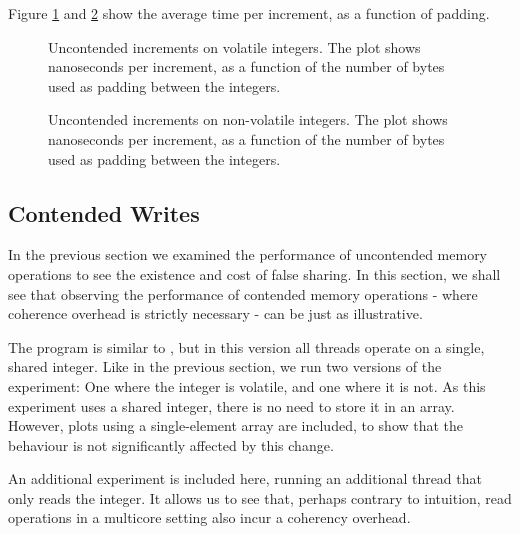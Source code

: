 Figure \ref{fig:uncont} and \ref{fig:uncont-nob} show the average time per
increment, as a function of padding.

\begin{figure}[hbpt]
\graphicspath{{plots/}}

\caption{Uncontended increments on volatile integers. The plot shows nanoseconds
	per increment, as a function of the number of bytes used as padding
	between the integers.}
	\label{fig:uncont}
\end{figure}

\begin{figure}[hbpt]
\graphicspath{{plots/}}

\caption{Uncontended increments on non-volatile integers. The plot shows nanoseconds
	per increment, as a function of the number of bytes used as padding
	between the integers.}
\label{fig:uncont-nob}
\end{figure}


\subsection{Contended Writes}

In the previous section we examined the performance of uncontended memory
operations to see the existence and cost of false sharing. In this section, we
shall see that observing the performance of contended memory operations - where
coherence overhead is strictly necessary - can be just as illustrative.


The program is similar to , but in this version all threads operate on a single, shared integer. Like in the previous
section, we run two versions of the experiment: One where the integer is
volatile, and one where it is not. As this experiment uses a shared integer,
there is no need to store it in an array. However, plots using a single-element
array are included, to show that the behaviour is not significantly affected by
this change.

An additional experiment is included here, running an additional thread that
only reads the integer. It allows us to see that, perhaps contrary to intuition,
read operations in a multicore setting also incur a coherency overhead.


